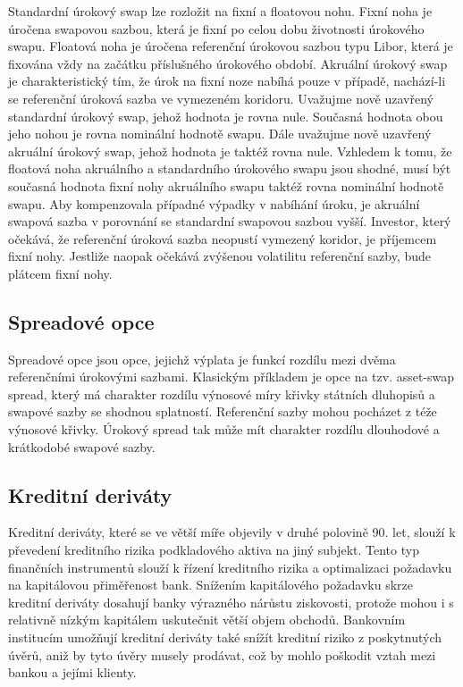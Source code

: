 \documentclass[a4paper]{book}
\begin{document}
Standardní úrokový swap lze rozložit na fixní a floatovou nohu. Fixní noha je úročena swapovou sazbou, která je fixní po celou dobu životnosti úrokového swapu. Floatová noha je úročena referenční úrokovou sazbou typu Libor, která je fixována vždy na začátku příslušného úrokového období. Akruální úrokový swap je charakteristický tím, že úrok na fixní noze nabíhá pouze v případě, nachází-li se referenční úroková sazba ve vymezeném koridoru. Uvažujme nově uzavřený standardní úrokový swap, jehož hodnota je rovna nule. Současná hodnota obou jeho nohou je rovna nominální hodnotě swapu. Dále uvažujme nově uzavřený akruální úrokový swap, jehož hodnota je taktéž rovna nule. Vzhledem k tomu, že floatová noha akruálního a standardního úrokového swapu jsou shodné, musí být současná hodnota fixní nohy akruálního swapu taktéž rovna nominální hodnotě swapu. Aby kompenzovala případné výpadky v nabíhání úroku, je akruální swapová sazba v porovnání se standardní swapovou sazbou vyšší. Investor, který očekává, že referenční úroková sazba neopustí vymezený koridor, je příjemcem fixní nohy. Jestliže naopak očekává zvýšenou volatilitu referenční sazby, bude plátcem fixní nohy.

\subsection{Spreadové opce}

Spreadové opce jsou opce, jejichž výplata je funkcí rozdílu mezi dvěma referenčními úrokovými sazbami. Klasickým příkladem je opce na tzv. asset-swap spread, který má charakter rozdílu výnosové míry křivky státních dluhopisů a swapové sazby se shodnou splatností. Referenční sazby mohou pocházet z téže výnosové křivky. Úrokový spread tak může mít charakter rozdílu dlouhodové a krátkodobé swapové sazby.

\subsection{Kreditní deriváty}

Kreditní deriváty, které se ve větší míře objevily v druhé polovině 90. let, slouží k převedení kreditního rizika podkladového aktiva na jiný subjekt. Tento typ finančních instrumentů slouží k řízení kreditního rizika a optimalizaci požadavku na kapitálovou přiměřenost bank. Snížením kapitálového požadavku skrze kreditní deriváty dosahují banky výrazného nárůstu ziskovosti, protože mohou i s relativně nízkým kapitálem uskutečnit větší objem obchodů. Bankovním institucím umožňují kreditní deriváty také snížít kreditní riziko z poskytnutých úvěrů, aniž by tyto úvěry musely prodávat, což by mohlo poškodit vztah mezi bankou a jejími klienty. 
\end{document}
